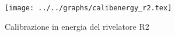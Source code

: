 \begin{figure}[h] \centering\texttt{[image: ../../graphs/calibenergy\_r2.tex]}\caption{Calibrazione in energia del rivelatore R2}\label{gr:calibenergy_r2} \end{figure}
